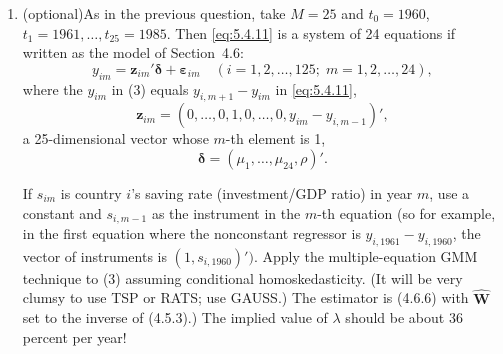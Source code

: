 \begin{problemset}
\begin{enumerate}[label=(\alph*)]
  \textbf{TSP Tip:} TSP's command for the fixed-effects estimator (with the spherical
  error assumption) is \texttt{PANEL}. It, however, does not accept the data organization
  of \texttt{SUM\_HES.ASC}. It requires that the group (country) ID and the year
  be included in the rows containing information on group-years. The data file
  that \texttt{PANEL} can accept is \texttt{FIXED.ASC}. Its first few records are:

  \begin{verbatim}
1 0 0  1961  1599  1723
1 0 0  1962  1275  1599
     :
1 0 0  1984  2962  2903
1 0 0  1985  2988  2962
2 0 0  1961   976   931
2 0 0  1962   984   976
     :
  \end{verbatim}

  Here, the first variable is the country ID, followed by \emph{COM}, \emph{OPEC}, year, real
  per capita GDP for the year, and real per capita GDP for the previous year.

\item (optional)\quad As in the previous question, take $M = 25$ and $t_0 = 1960$,
  $t_1 = 1961, \ldots, t_{25} = 1985$. Then \eqref{eq:5.4.11} is a system of 24 equations if
  written as the model of Section~4.6:
  \begin{equation}
    y_{im} = \mathbf{z}_{im}'\boldsymbol{\delta} + \boldsymbol{\varepsilon}_{im}
    \quad (i = 1, 2, \ldots, 125;\; m = 1, 2, \ldots, 24), \tag{3}
  \end{equation}
  where the $y_{im}$ in (3) equals $y_{i,m+1} - y_{im}$ in \eqref{eq:5.4.11},
  \[
    \mathbf{z}_{im} = (0, \ldots, 0, 1, 0, \ldots, 0, y_{im} - y_{i,m-1})',
  \]
  a 25-dimensional vector whose $m$-th element is 1,
  \[
    \boldsymbol{\delta} = (\mu_1, \ldots, \mu_{24}, \rho)'.
  \]

  If $s_{im}$ is country $i$'s saving rate (investment/GDP ratio) in year $m$, use a constant
  and $s_{i,m-1}$ as the instrument in the $m$-th equation (so for example, in the
  first equation where the nonconstant regressor is $y_{i,1961} - y_{i,1960}$, the vector of
  instruments is $(1, s_{i,1960})')$.
  Apply the multiple-equation GMM technique to (3)
  assuming conditional homoskedasticity. (It will be very clumsy to use TSP
  or RATS; use GAUSS.) The estimator is (4.6.6) with $\hat{\mathbf{W}}$ set to the inverse of
  (4.5.3).) The implied value of $\lambda$ should be about 36 percent per year!
\end{enumerate}

\end{problemset}

